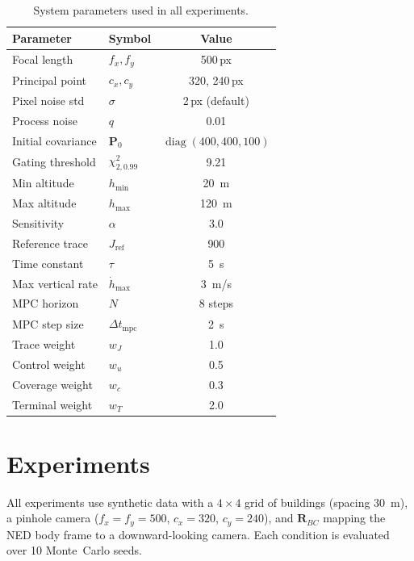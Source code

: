 \documentclass[journal]{IEEEtran}
\newcommand{\vP}{\mathbf{P}}
\newcommand{\vR}{\mathbf{R}}
\begin{document}
\begin{table}[t]
\centering
\caption{System parameters used in all experiments.}
\label{tab:params}
\begin{tabular}{@{}llc@{}}
\toprule
\textbf{Parameter} & \textbf{Symbol} & \textbf{Value} \\
\midrule
Focal length & $f_x, f_y$ & 500\,px \\
Principal point & $c_x, c_y$ & 320, 240\,px \\
Pixel noise std & $\sigma$ & 2\,px (default) \\
Process noise & $q$ & 0.01 \\
Initial covariance & $\vP_0$ & $\operatorname{diag}(400, 400, 100)$ \\
Gating threshold & $\chi^2_{2,0.99}$ & 9.21 \\
\midrule
Min altitude & $h_{\min}$ & \SI{20}{m} \\
Max altitude & $h_{\max}$ & \SI{120}{m} \\
Sensitivity & $\alpha$ & 3.0 \\
Reference trace & $J_{\text{ref}}$ & 900 \\
Time constant & $\tau$ & \SI{5}{s} \\
Max vertical rate & $\dot{h}_{\max}$ & \SI{3}{m/s} \\
\midrule
MPC horizon & $N$ & 8 steps \\
MPC step size & $\Delta t_{\text{mpc}}$ & \SI{2}{s} \\
Trace weight & $w_J$ & 1.0 \\
Control weight & $w_u$ & 0.5 \\
Coverage weight & $w_c$ & 0.3 \\
Terminal weight & $w_T$ & 2.0 \\
\bottomrule
\end{tabular}
\end{table}

\section{Experiments}

All experiments use synthetic data with a $4 \times 4$ grid of buildings (spacing \SI{30}{m}), a pinhole camera ($f_x{=}f_y{=}500$, $c_x{=}320$, $c_y{=}240$), and $\vR_{BC}$ mapping the NED body frame to a downward-looking camera.
Each condition is evaluated over 10 Monte~Carlo seeds.
\end{document}
